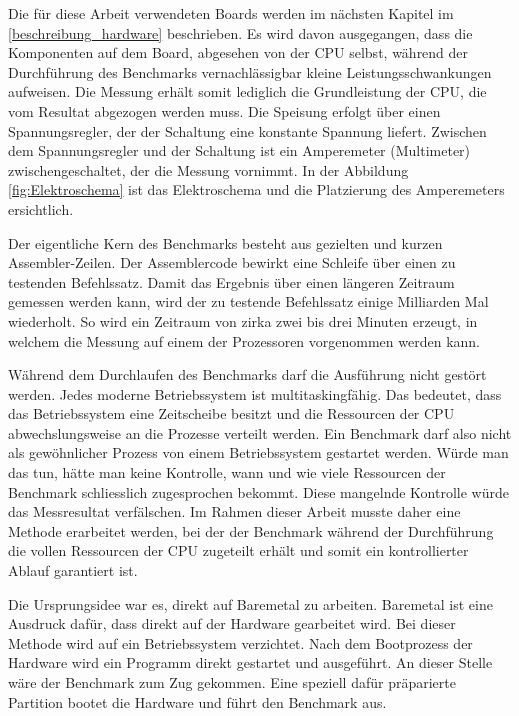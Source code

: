 Die für diese Arbeit verwendeten Boards werden im nächsten Kapitel im \autoref{beschreibung_hardware} beschrieben. Es wird davon ausgegangen, dass die Komponenten auf dem Board, abgesehen von der CPU selbst, während der Durchführung des Benchmarks vernachlässigbar kleine Leistungsschwankungen aufweisen. Die Messung erhält somit lediglich die Grundleistung der CPU, die vom Resultat abgezogen werden muss. Die Speisung erfolgt über einen Spannungsregler, der der Schaltung eine konstante Spannung liefert. Zwischen dem Spannungsregler und der Schaltung ist ein Amperemeter (Multimeter) zwischengeschaltet, der die Messung vornimmt. In der Abbildung \ref{fig:Elektroschema} ist das Elektroschema und die Platzierung des Amperemeters ersichtlich.
\par
Der eigentliche Kern des Benchmarks besteht aus gezielten und kurzen Assembler-Zeilen. Der Assemblercode bewirkt eine Schleife über einen zu testenden Befehlssatz. Damit das Ergebnis über einen längeren Zeitraum gemessen werden kann, wird der zu testende Befehlssatz einige Milliarden Mal wiederholt. So wird ein Zeitraum von zirka zwei bis drei Minuten erzeugt, in welchem die Messung auf einem der Prozessoren vorgenommen werden kann.
\par
Während dem Durchlaufen des Benchmarks darf die Ausführung nicht gestört werden. Jedes moderne Betriebssystem ist multitaskingfähig. Das bedeutet, dass das Betriebssystem eine Zeitscheibe besitzt und die Ressourcen der CPU abwechslungsweise an die Prozesse verteilt werden. Ein Benchmark darf also nicht als gewöhnlicher Prozess von einem Betriebssystem gestartet werden. Würde man das tun, hätte man keine Kontrolle, wann und wie viele Ressourcen der Benchmark schliesslich zugesprochen bekommt. Diese mangelnde Kontrolle würde das Messresultat verfälschen. Im Rahmen dieser Arbeit musste daher eine Methode erarbeitet werden, bei der der Benchmark während der Durchführung die vollen Ressourcen der CPU zugeteilt erhält und somit ein kontrollierter Ablauf garantiert ist.
\par
Die Ursprungsidee war es, direkt auf Baremetal zu arbeiten. Baremetal ist eine Ausdruck dafür, dass direkt auf der Hardware gearbeitet wird. Bei dieser Methode wird auf ein Betriebssystem verzichtet. Nach dem Bootprozess der Hardware wird ein Programm direkt gestartet und ausgeführt. An dieser Stelle wäre der Benchmark zum Zug gekommen. Eine speziell dafür präparierte Partition bootet die Hardware und führt den Benchmark aus.
\par
